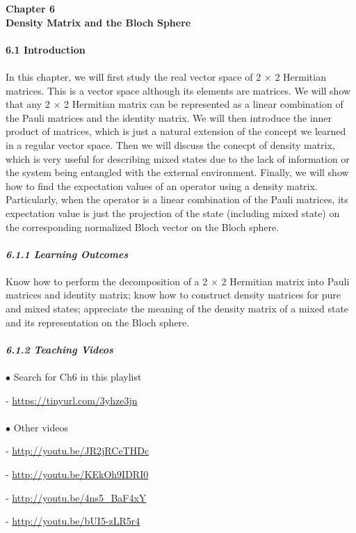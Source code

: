 \documentclass{article}
\newcommand{\bfit}[1]{\textit{\textbf{#1}}}
\begin{document}
\textbf{\Large Chapter 6\\ Density Matrix and the Bloch Sphere}\\\\
\textbf{\large 6.1 Introduction}\\\\
In this chapter, we will first study the real vector space of 2 $\times$ 2 Hermitian matrices.
This is a vector space although its elements are matrices. We will show that any 2 $\times$ 2 Hermitian 
matrix can be represented as a linear combination of the Pauli matrices
and the identity matrix. We will then introduce the inner product of matrices,
which is just a natural extension of the concept we learned in a regular vector space.
Then we will discuss the conecpt of density matrix, which is very useful for describing
mixed states due to the lack of information or the system being entangled
with the external environment. Finally, we will show how to find the expectation values
of an operator using a density matrix. Particularly, when the operator is a linear combination of the 
Pauli matrices, its expectation value is just the projection of the state
(including mixed state) on the corresponding normalized Bloch vector on the Bloch sphere.
\\\\
\bfit{\large 6.1.1 Learning Outcomes}\\\\
Know how to perform the decomposition of a 2 $\times$ 2 Hermitian matrix into
Pauli matrices and identity matrix; know how to construct density matrices
for pure and mixed states; appreciate the meaning of the density matrix of a mixed
state and its representation on the Bloch sphere.\\\\
\bfit{\large 6.1.2 Teaching Videos}\\\\
$\bullet$ Search for Ch6 in this playlist

- \url{https://tinyurl.com/3yhze3jn}\\\\
$\bullet$ Other videos

- \url{http://youtu.be/JR2jRCeTHDc}

- \url{http://youtu.be/KEkOh9IDRI0}

- \url{http://youtu.be/4ns5_BaF4xY}

- \url{http://youtu.be/bUI5-zLR5r4}\\\\
\end{document}
